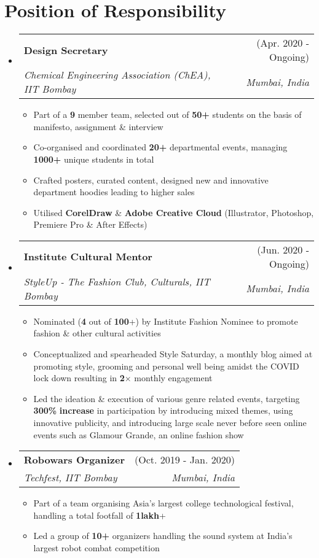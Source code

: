 \documentclass[a4paper,11pt]{article}
\makeatletter
\newcommand{\resumeItem}[1]{
  \item\small{
    {#1 \vspace{-2pt}}
  }
}
\newcommand{\resumeSubheading}[4]{
  \vspace{-2pt}\item
    \begin{tabular*}{\textwidth}[t]{l@{\extracolsep{\fill}}r}
      \textbf{#1} & #2 \\
      \textit{\small#3} & \textit{\small #4} \\
    \end{tabular*}\vspace{-7pt}
}
\newcommand{\resumeSubHeadingListStart}{\begin{itemize}[leftmargin=-0pt, label={}]}
\newcommand{\resumeSubHeadingListEnd}{\end{itemize}}
\newcommand{\resumeItemListStart}{\begin{itemize}}
\newcommand{\resumeItemListEnd}{\end{itemize}\vspace{-5pt}}
\makeatother
\begin{document}
  \section{Position of Responsibility}
    \resumeSubHeadingListStart
      
      \resumeSubheading
        {Design Secretary}{(Apr. 2020 - Ongoing)}
        {Chemical Engineering Association (ChEA), IIT Bombay}{Mumbai, India}
        \resumeItemListStart
          \resumeItem{Part of a \textbf{9} member team, selected out of \textbf{50+} students on the basis of manifesto, assignment \& interview}
          \resumeItem{Co-organised and coordinated \textbf{20+} departmental events, managing \textbf{1000+} unique students in total}
          \resumeItem{Crafted posters, curated content, designed new and innovative department hoodies leading to higher sales}
          \resumeItem{Utilised \textbf{CorelDraw} \& \textbf{Adobe Creative Cloud} (Illustrator, Photoshop, Premiere Pro \& After Effects)}
      \resumeItemListEnd
      \resumeSubheading
        {Institute Cultural Mentor}{(Jun. 2020 - Ongoing)}
        {StyleUp - The Fashion Club, Culturals, IIT Bombay}{Mumbai, India}
        \resumeItemListStart
          \resumeItem{Nominated (\textbf{4} out of \textbf{100}+) by Institute Fashion Nominee to promote fashion \& other cultural activities}
          \resumeItem{Conceptualized and spearheaded Style Saturday, a monthly blog aimed at promoting style, grooming and personal well being amidst the COVID lock down resulting in \textbf{2$\times$} monthly engagement}
          \resumeItem{Led the ideation \& execution of various genre related events, targeting \textbf{300\%} \textbf{increase} in participation by introducing mixed themes, using innovative publicity, and introducing large scale never before seen online events such as Glamour Grande, an online fashion show}
        \resumeItemListEnd
      \resumeSubheading
        {Robowars Organizer}{(Oct. 2019 - Jan. 2020)}
        {Techfest, IIT Bombay}{Mumbai, India}
        \resumeItemListStart
        \resumeItem{Part of a team organising Asia’s largest college technological festival, handling a total footfall of \textbf{1lakh}+}
        \resumeItem{Led a group of \textbf{10+} organizers handling the sound system at India's largest robot combat competition}
      \resumeItemListEnd
      
    \resumeSubHeadingListEnd    


\end{document}
